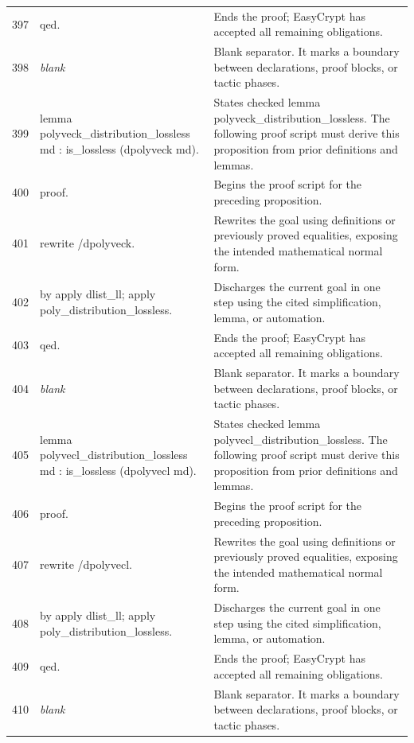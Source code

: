 \documentclass[10pt]{article}
\begin{document}
\begin{longtable}{r L{0.53\textwidth} L{0.37\textwidth}}
397 & {\ttfamily\scriptsize qed.} & Ends the proof; EasyCrypt has accepted all remaining obligations. \\
398 & {\ttfamily\scriptsize \emph{blank}} & Blank separator.  It marks a boundary between declarations, proof blocks, or tactic phases. \\
399 & {\ttfamily\scriptsize lemma polyveck\_distribution\_lossless md : is\_lossless (dpolyveck md).} & States checked lemma polyveck\_distribution\_lossless.  The following proof script must derive this proposition from prior definitions and lemmas. \\
400 & {\ttfamily\scriptsize proof.} & Begins the proof script for the preceding proposition. \\
401 & {\ttfamily\scriptsize rewrite /dpolyveck.} & Rewrites the goal using definitions or previously proved equalities, exposing the intended mathematical normal form. \\
402 & {\ttfamily\scriptsize by apply dlist\_ll; apply poly\_distribution\_lossless.} & Discharges the current goal in one step using the cited simplification, lemma, or automation. \\
403 & {\ttfamily\scriptsize qed.} & Ends the proof; EasyCrypt has accepted all remaining obligations. \\
404 & {\ttfamily\scriptsize \emph{blank}} & Blank separator.  It marks a boundary between declarations, proof blocks, or tactic phases. \\
405 & {\ttfamily\scriptsize lemma polyvecl\_distribution\_lossless md : is\_lossless (dpolyvecl md).} & States checked lemma polyvecl\_distribution\_lossless.  The following proof script must derive this proposition from prior definitions and lemmas. \\
406 & {\ttfamily\scriptsize proof.} & Begins the proof script for the preceding proposition. \\
407 & {\ttfamily\scriptsize rewrite /dpolyvecl.} & Rewrites the goal using definitions or previously proved equalities, exposing the intended mathematical normal form. \\
408 & {\ttfamily\scriptsize by apply dlist\_ll; apply poly\_distribution\_lossless.} & Discharges the current goal in one step using the cited simplification, lemma, or automation. \\
409 & {\ttfamily\scriptsize qed.} & Ends the proof; EasyCrypt has accepted all remaining obligations. \\
410 & {\ttfamily\scriptsize \emph{blank}} & Blank separator.  It marks a boundary between declarations, proof blocks, or tactic phases. \\

\end{longtable}
\end{document}
